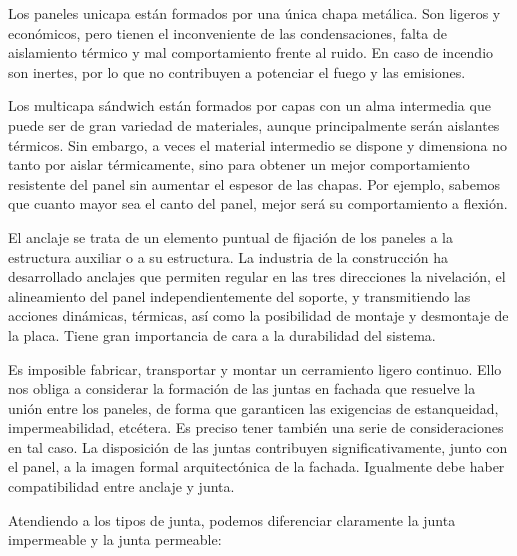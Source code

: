 Los paneles unicapa están formados por una única chapa metálica. Son ligeros y económicos, pero tienen el inconveniente de las condensaciones, falta de aislamiento térmico y mal comportamiento frente al ruido. En caso de incendio son inertes, por lo que no contribuyen a potenciar el fuego y las emisiones.

Los multicapa sándwich están formados por capas con un alma intermedia que puede ser de gran variedad de materiales, aunque principalmente serán aislantes térmicos. Sin embargo, a veces el material intermedio se dispone y dimensiona no tanto por aislar térmicamente, sino para obtener un mejor comportamiento resistente del panel sin aumentar el espesor de las chapas. Por ejemplo, sabemos que cuanto mayor sea el canto del panel, mejor será su comportamiento a flexión.

El anclaje se trata de un elemento puntual de fijación de los paneles a la estructura auxiliar o a su estructura. La industria de la construcción ha desarrollado anclajes que permiten regular en las tres direcciones la nivelación, el alineamiento del panel independientemente del soporte, y transmitiendo las acciones dinámicas, térmicas, así como la posibilidad de montaje y desmontaje de la placa. Tiene gran importancia de cara a la durabilidad del sistema.

Es imposible fabricar, transportar y montar un cerramiento ligero continuo. Ello nos obliga a considerar la formación de las juntas en fachada que resuelve la unión entre los paneles, de forma que garanticen las exigencias de estanqueidad, impermeabilidad, etcétera. Es preciso tener también una serie de consideraciones en tal caso. La disposición de las juntas contribuyen significativamente, junto con el panel, a la imagen formal arquitectónica de la fachada. Igualmente debe haber compatibilidad entre anclaje y junta.

Atendiendo a los tipos de junta, podemos diferenciar claramente la junta impermeable y la junta permeable:

